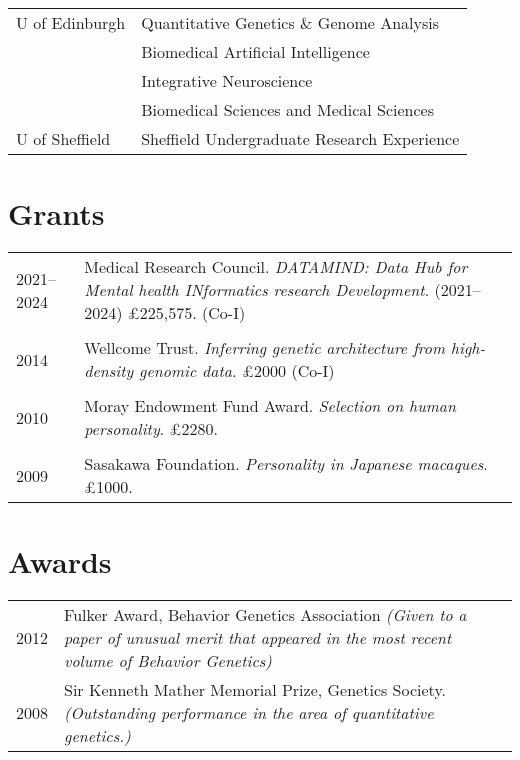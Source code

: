\documentclass[11pt]{article}
\begin{document}
\begin{tabular}{p{3cm}p{12cm}}
U of Edinburgh & Quantitative Genetics \& Genome Analysis \\
& Biomedical Artificial Intelligence \\
& Integrative Neuroscience \\
& Biomedical Sciences and Medical Sciences \\
U of Sheffield & Sheffield Undergraduate Research Experience 
\end{tabular}

\section*{Grants}

\begin{tabular}{p{3cm}p{12cm}}

2021--2024 & Medical Research Council. \emph{DATAMIND: Data Hub for Mental health INformatics research Development}. (2021--2024) £225,575. (Co-I) \\ \\

2014 & Wellcome Trust. \emph{Inferring genetic architecture from high-density genomic data.} £2000 (Co-I) \\ \\

2010 & Moray Endowment Fund Award. \emph{Selection on human personality}. £2280. \\ \\

2009 & Sasakawa Foundation. \emph{Personality in Japanese macaques}. £1000.

\end{tabular}

\section*{Awards}

\begin{tabular}{p{3cm}p{12cm}}

2012 & Fulker Award, Behavior Genetics Association \emph{(Given to a paper of unusual merit that appeared in the most recent volume of Behavior Genetics)} \\
2008 & Sir Kenneth Mather Memorial Prize, Genetics Society. \emph{(Outstanding performance in the area of quantitative genetics.)}

\end{tabular}
\end{document}
